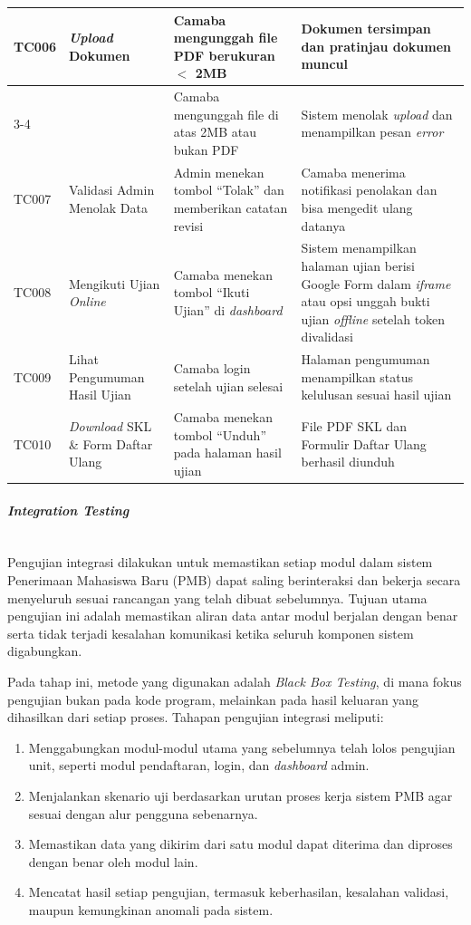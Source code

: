 \begin{longtable}{|p{}|p{}|p{}|p{}|}
	\hline
	TC006 & \textit{Upload} Dokumen & Camaba mengunggah file PDF berukuran $<$ 2MB & Dokumen tersimpan dan pratinjau dokumen muncul \\
	\cline{3-4}
	& & Camaba mengunggah file di atas 2MB atau bukan PDF & Sistem menolak \textit{upload} dan menampilkan pesan \textit{error} \\
	\hline
	TC007 & Validasi Admin Menolak Data & Admin menekan tombol ``Tolak'' dan memberikan catatan revisi & Camaba menerima notifikasi penolakan dan bisa mengedit ulang datanya \\
	\hline
	TC008 & Mengikuti Ujian \textit{Online} & Camaba menekan tombol ``Ikuti Ujian'' di \textit{dashboard} & Sistem menampilkan halaman ujian berisi Google Form dalam \textit{iframe} atau opsi unggah bukti ujian \textit{offline} setelah token divalidasi \\
	\hline
	TC009 & Lihat Pengumuman Hasil Ujian & Camaba login setelah ujian selesai & Halaman pengumuman menampilkan status kelulusan sesuai hasil ujian \\
	\hline
	TC010 & \textit{Download} SKL \& Form Daftar Ulang & Camaba menekan tombol ``Unduh'' pada halaman hasil ujian & File PDF SKL dan Formulir Daftar Ulang berhasil diunduh \\
	\hline
\end{longtable}

\paragraph{\textit{Integration Testing}}~\\
Pengujian integrasi dilakukan untuk memastikan setiap modul dalam sistem Penerimaan Mahasiswa Baru (PMB) dapat saling berinteraksi dan bekerja secara menyeluruh sesuai rancangan yang telah dibuat sebelumnya. Tujuan utama pengujian ini adalah memastikan aliran data antar modul berjalan dengan benar serta tidak terjadi kesalahan komunikasi ketika seluruh komponen sistem digabungkan.\par

Pada tahap ini, metode yang digunakan adalah \textit{Black Box Testing}, di mana fokus pengujian bukan pada kode program, melainkan pada hasil keluaran yang dihasilkan dari setiap proses. Tahapan pengujian integrasi meliputi:\par

\begin{enumerate}[noitemsep]
	\item Menggabungkan modul-modul utama yang sebelumnya telah lolos pengujian unit, seperti modul pendaftaran, login, dan \textit{dashboard} admin.
	\item Menjalankan skenario uji berdasarkan urutan proses kerja sistem PMB agar sesuai dengan alur pengguna sebenarnya.
	\item Memastikan data yang dikirim dari satu modul dapat diterima dan diproses dengan benar oleh modul lain.
	\item Mencatat hasil setiap pengujian, termasuk keberhasilan, kesalahan validasi, maupun kemungkinan anomali pada sistem.
\end{enumerate}

